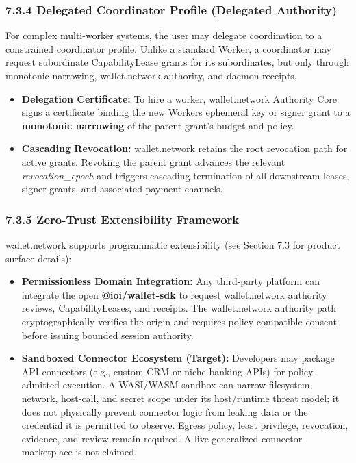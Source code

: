 \documentclass[
  11pt,
]{article}
\providecommand{\tightlist}{%
  \setlength{\itemsep}{0pt}\setlength{\parskip}{0pt}}
\begin{document}
\hypertarget{delegated-coordinator-profile-delegated-authority}{%
\subsubsection{7.3.4 Delegated Coordinator Profile (Delegated
Authority)}\label{delegated-coordinator-profile-delegated-authority}}

For complex multi-worker systems, the user may delegate coordination to a constrained
coordinator profile. Unlike a standard Worker, a coordinator may request
subordinate CapabilityLease grants for its subordinates, but only
through monotonic narrowing, wallet.network authority, and daemon
receipts.

\begin{itemize}
\tightlist
\item
  \textbf{Delegation Certificate:} To hire a worker, wallet.network
  Authority Core signs a certificate binding the new Worker\textquotesingle s
  ephemeral key or signer grant to a \textbf{monotonic narrowing} of the
  parent grant's budget and policy.
\item
  \textbf{Cascading Revocation:} wallet.network retains the root
  revocation path for active grants. Revoking the parent grant advances the relevant
  \emph{revocation\_epoch} and triggers cascading termination of all
  downstream leases, signer grants, and associated payment channels.
\end{itemize}

\hypertarget{zero-trust-extensibility-framework}{%
\subsubsection{7.3.5 Zero-Trust Extensibility
Framework}\label{zero-trust-extensibility-framework}}

wallet.network supports programmatic extensibility (see Section
7.3 for product surface details):

\begin{itemize}
\tightlist
\item
  \textbf{Permissionless Domain Integration:} Any third-party platform
  can integrate the open \textbf{@ioi/wallet-sdk} to request
  wallet.network authority reviews, CapabilityLeases, and receipts. The
  wallet.network authority path cryptographically verifies the origin
  and requires policy-compatible consent before issuing bounded session
  authority.
\item
  \textbf{Sandboxed Connector Ecosystem (Target):} Developers may package API
  connectors (e.g., custom CRM or niche banking APIs) for policy-admitted
  execution. A WASI/WASM sandbox can narrow filesystem, network, host-call, and
  secret scope under its host/runtime threat model; it does not physically
  prevent connector logic from leaking data or the credential it is permitted
  to observe. Egress policy, least privilege, revocation, evidence, and review
  remain required. A live generalized connector marketplace is not claimed.
\end{itemize}
\end{document}

